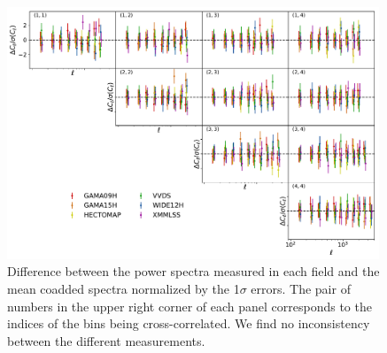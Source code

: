 \documentclass[a4paper,11pt]{article}
\begin{document}
      \begin{figure}
        \centering
        \includegraphics[width=0.99\textwidth]{figures/cls_consistency.pdf}
        \caption{Difference between the power spectra measured in each field and the mean coadded spectra normalized by the 1$\sigma$ errors. The pair of numbers in the upper right corner of each panel corresponds to the indices of the bins being cross-correlated. We find no inconsistency between the different measurements.}
        \label{fig:cls_consistency}
      \end{figure}
      
\end{document}
